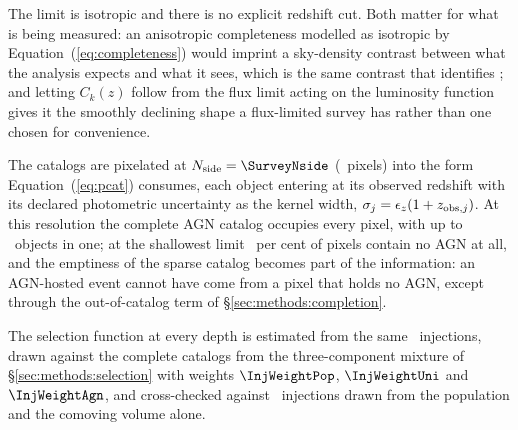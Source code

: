 The limit is isotropic and there is no explicit redshift cut. Both matter for
what is being measured: an anisotropic completeness modelled as isotropic by
Equation~(\ref{eq:completeness}) would imprint a sky-density contrast between
what the analysis expects and what it sees, which is the same contrast that
identifies \fagn; and letting $C_k(z)$ follow from the flux limit acting on the
luminosity function gives it the smoothly declining shape a flux-limited survey
has rather than one chosen for convenience.

The catalogs are pixelated at $N_{\rm side} = \SurveyNside$
(\SurveyNpix\ pixels) into the form Equation~(\ref{eq:pcat}) consumes, each
object entering at its observed redshift with its declared photometric
uncertainty as the kernel width, $\sigma_j = \epsilon_z(1 + z_{{\rm obs},j})$. At
this resolution the complete AGN catalog occupies every pixel, with up to
\AgnPerPix\ objects in one; at the shallowest limit \AgnEmptyPixShallow\ per
cent of pixels contain no AGN at all, and the emptiness of the sparse catalog
becomes part of the information: an AGN-hosted event cannot have come from a
pixel that holds no AGN, except through the out-of-catalog term of
\S\ref{sec:methods:completion}.

The selection function at every depth is estimated from the same
\InjNdrawMain\ injections, drawn against the complete catalogs from the
three-component mixture of \S\ref{sec:methods:selection} with weights
$\InjWeightPop$, $\InjWeightUni$ and $\InjWeightAgn$, and cross-checked
against \InjNdrawCross\ injections drawn from the population and the comoving
volume alone.
